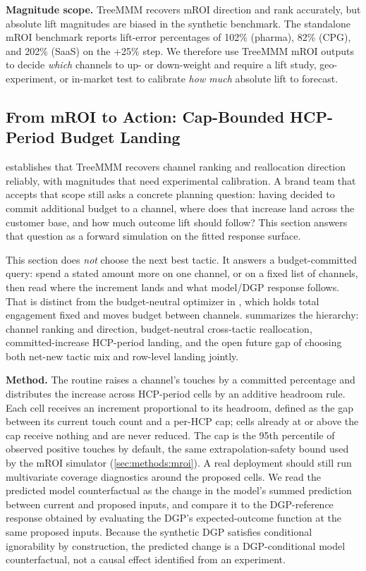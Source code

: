 \documentclass[review,12pt]{elsarticle}
\begin{document}
\textbf{Magnitude scope.} TreeMMM recovers mROI direction and rank accurately,
but absolute lift magnitudes are biased in the synthetic benchmark. The
standalone mROI benchmark reports lift-error percentages of 102\% (pharma),
82\% (CPG), and 202\% (SaaS) on the +25\% step. We therefore use TreeMMM mROI
outputs to decide \emph{which} channels to up- or down-weight and require a
lift study, geo-experiment, or in-market test to calibrate \emph{how much}
absolute lift to forecast.

\clearpage

\subsection{From mROI to Action: Cap-Bounded HCP-Period Budget Landing}
\label{sec:results:landing}

 establishes that TreeMMM recovers channel ranking and
reallocation direction reliably, with magnitudes that need experimental
calibration. A brand team that accepts that scope still asks a concrete
planning question: having decided to commit additional budget to a channel,
where does that increase land across the customer base, and how much outcome
lift should follow? This section answers that question as a forward simulation
on the fitted response surface.

This section does \emph{not} choose the next best tactic. It answers a
budget-committed query: spend a stated amount more on one channel, or on a
fixed list of channels, then read where the increment lands and what model/DGP
response follows. That is distinct from the budget-neutral optimizer in
, which holds total engagement fixed and moves budget
between channels.  summarizes the
hierarchy: channel ranking and direction, budget-neutral cross-tactic
reallocation, committed-increase HCP-period landing, and the open future gap of
choosing both net-new tactic mix and row-level landing jointly.

\textbf{Method.} The
routine raises a channel's
touches by a committed percentage and distributes the increase across
HCP-period cells by an additive headroom rule. Each cell receives an increment
proportional to its headroom, defined as the gap between its current touch
count and a per-HCP cap; cells already at or above the cap receive nothing and
are never reduced. The cap is the 95th percentile of observed positive touches
by default, the same extrapolation-safety bound used by the mROI simulator
(\ref{sec:methods:mroi}). A real deployment should still run multivariate
coverage diagnostics around the proposed cells. We read the predicted model
counterfactual as the change in the model's summed prediction between current
and proposed inputs, and compare it to the DGP-reference response obtained by
evaluating the DGP's expected-outcome function at the same proposed inputs.
Because the synthetic DGP satisfies conditional ignorability by construction,
the predicted change is a DGP-conditional model counterfactual, not a causal
effect identified from an experiment.
\end{document}
